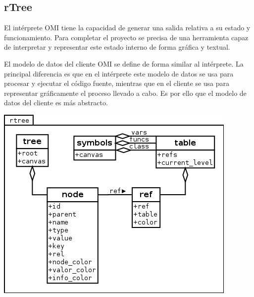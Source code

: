 \subsection {rTree} 
El intérprete OMI tiene la capacidad de generar una salida relativa
a su estado y funcionamiento. Para completar el proyecto se precisa 
de una herramienta capaz de interpretar y representar este estado 
interno de forma gráfica y textual. 

El modelo de datos del cliente OMI se define de forma similar al intérprete.
La principal diferencia es que en el intérprete este modelo de datos se usa para procesar y 
ejecutar el código fuente, mientras que en el cliente se usa para representar gráficamente 
el proceso llevado a cabo. Es por ello que el modelo de datos del cliente es más abstracto. 

\begin{center}
\includegraphics[scale=0.6]{rtree.png} \\
\end{center}

